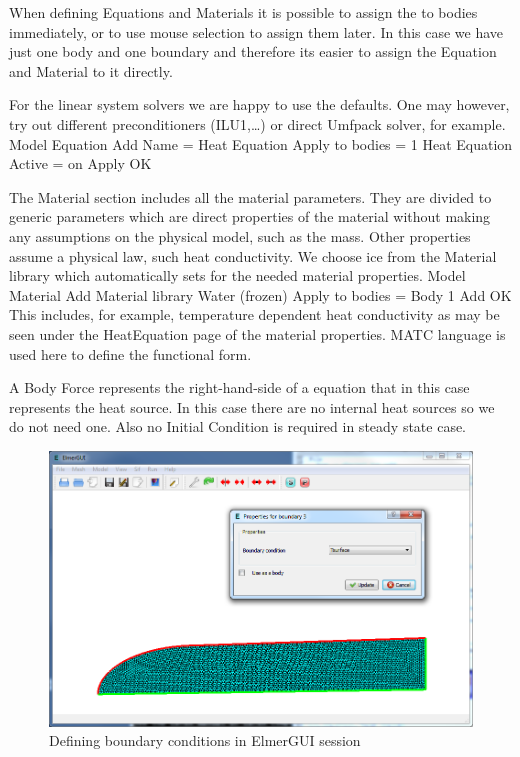 When defining Equations and Materials it is possible to assign the to bodies immediately, or to use mouse
selection to assign them later. In this case we have just one body and one boundary and therefore its easier to assign 
the Equation and Material to it directly.

For the linear system solvers we are happy to use the defaults. One may however, try out different
preconditioners (ILU1,\ldots) or direct Umfpack solver, for example.
\ttbegin
Model
  Equation
    Add 
      Name = Heat Equation
      Apply to bodies = 1
      Heat Equation
        Active = on
  Apply   
  OK
\ttend        

The Material section includes all the material parameters.
They are divided to generic parameters which are direct properties of the material
without making any assumptions on the physical model, such as the mass. Other properties assume
a physical law, such heat conductivity.
We choose ice from the Material library which automatically sets for the needed material properties. 
\ttbegin
Model
  Material
    Add 
      Material library
        Water (frozen)
      Apply to bodies = Body 1 
      Add 
      OK
\ttend
This includes, for example, temperature dependent heat conductivity as may be seen under the HeatEquation page of
the material properties. MATC language is used here to define the functional form.


A Body Force represents the right-hand-side of a equation that in this case represents
the heat source. In this case there are no internal heat sources so we do not need one.
Also no Initial Condition is required in steady state case.

\begin{figure}
\begin{center}
\includegraphics[width=120mm]{glacier_toy_gui}
\caption{Defining boundary conditions in ElmerGUI session}\label{glac:bc}
\end{center}
\end{figure}

